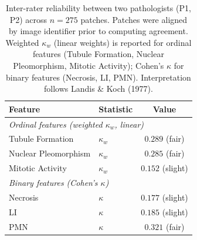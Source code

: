 \begin{table}[h!]
\centering
\caption{Inter-rater reliability between two pathologists (P1, P2) across $n=275$ patches. Patches were aligned by image identifier prior to computing agreement. Weighted $\kappa_w$ (linear weights) is reported for ordinal features (Tubule Formation, Nuclear Pleomorphism, Mitotic Activity); Cohen's $\kappa$ for binary features (Necrosis, LI, PMN). Interpretation follows Landis \& Koch (1977).}
\label{tab:interrater}
\small
\begin{tabular}{llc}
\toprule
\textbf{Feature} & \textbf{Statistic} & \textbf{Value} \\
\midrule
\multicolumn{3}{l}{\textit{Ordinal features (weighted $\kappa_w$, linear)}} \\
\midrule
    Tubule Formation & $\kappa_w$ & $0.289$ (fair) \\
    Nuclear Pleomorphism & $\kappa_w$ & $0.285$ (fair) \\
    Mitotic Activity & $\kappa_w$ & $0.152$ (slight) \\
\midrule
\multicolumn{3}{l}{\textit{Binary features (Cohen's $\kappa$)}} \\
\midrule
    Necrosis & $\kappa$ & $0.177$ (slight) \\
    LI & $\kappa$ & $0.185$ (slight) \\
    PMN & $\kappa$ & $0.321$ (fair) \\
\bottomrule
\end{tabular}
\end{table}